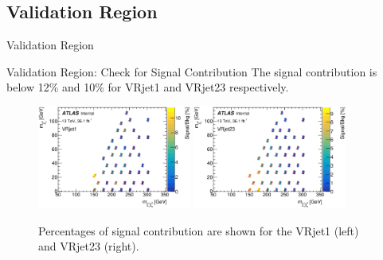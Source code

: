 \documentclass[mathserif,serif]{beamer}
\begin{document}


\subsection{Validation Region}
\begin{frame}
\begin{center}
\huge
Validation Region
\end{center}
\end{frame}

\begin{frame}{Validation Region: Check for Signal Contribution}
The signal contribution is below 12\% and 10\% for VRjet1 and VRjet23 respectively.
\begin{figure}
\centering
\includegraphics[width=0.45\textwidth]{data/plot/VR/SignalContamination_VRjet1.eps}
\includegraphics[width=0.45\textwidth]{data/plot/VR/SignalContamination_VRjet23.eps}
\caption{Percentages of signal contribution are shown for the VRjet1 (left) and VRjet23 (right).}
\end{figure}
\end{frame}
\end{document}
